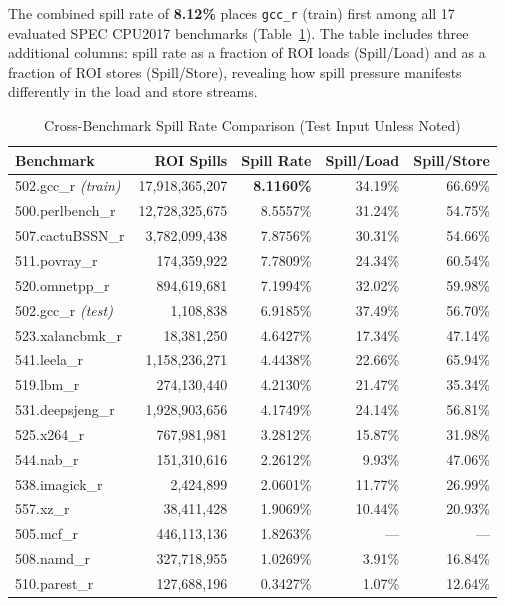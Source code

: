 \documentclass[conference]{IEEEtran}
\begin{document}
The combined spill rate of \textbf{8.12\%} places \texttt{gcc\_r}
(train) first among all 17 evaluated SPEC CPU2017 benchmarks
(Table~\ref{tab:compare}). The table includes three additional
columns: spill rate as a fraction of ROI loads (Spill/Load) and
as a fraction of ROI stores (Spill/Store), revealing how spill
pressure manifests differently in the load and store streams.

\begin{table}[t]
\centering
\caption{Cross-Benchmark Spill Rate Comparison (Test Input Unless Noted)}
\label{tab:compare}
\begin{tabular}{lrrrr}
\toprule
\textbf{Benchmark} & \textbf{ROI Spills} & \textbf{Spill Rate}
    & \textbf{Spill/Load} & \textbf{Spill/Store} \\
\midrule
502.gcc\_r \textit{(train)}  & 17,918,365,207 & \textbf{8.1160\%} & 34.19\% & 66.69\% \\
500.perlbench\_r             &     12,728,325,675 & 8.5557\% & 31.24\% & 54.75\% \\
507.cactuBSSN\_r             &  3,782,099,438 & 7.8756\% & 30.31\% & 54.66\% \\
511.povray\_r                &    174,359,922 & 7.7809\% & 24.34\% & 60.54\% \\
520.omnetpp\_r               &    894,619,681 & 7.1994\% & 32.02\% & 59.98\% \\
502.gcc\_r \textit{(test)}   &      1,108,838 & 6.9185\% & 37.49\% & 56.70\% \\
523.xalancbmk\_r             &     18,381,250 & 4.6427\% & 17.34\% & 47.14\% \\
541.leela\_r                 &  1,158,236,271 & 4.4438\% & 22.66\% & 65.94\% \\
519.lbm\_r                   &    274,130,440 & 4.2130\% & 21.47\% & 35.34\% \\
531.deepsjeng\_r             &  1,928,903,656 & 4.1749\% & 24.14\% & 56.81\% \\
525.x264\_r                  &    767,981,981 & 3.2812\% & 15.87\% & 31.98\% \\
544.nab\_r                   &    151,310,616 & 2.2612\% &  9.93\% & 47.06\% \\
538.imagick\_r               &      2,424,899 & 2.0601\% & 11.77\% & 26.99\% \\
557.xz\_r                    &     38,411,428 & 1.9069\% & 10.44\% & 20.93\% \\
505.mcf\_r                   &    446,113,136 & 1.8263\% & --- & --- \\
508.namd\_r                  &    327,718,955 & 1.0269\% &  3.91\% & 16.84\% \\
510.parest\_r                &    127,688,196 & 0.3427\% &  1.07\% & 12.64\% \\
\bottomrule
\end{tabular}
\end{table}
\end{document}
